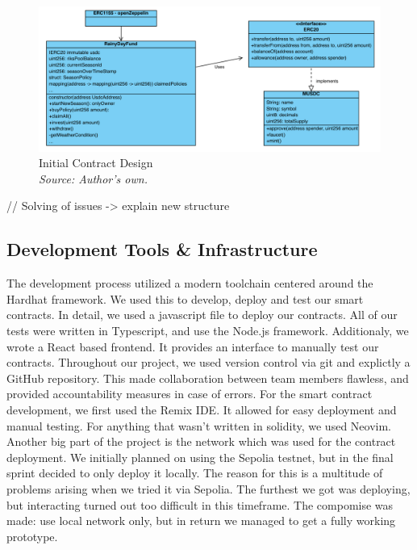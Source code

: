 \documentclass[11pt,a4paper]{article}
\begin{document}
    \begin{figure}[H]
        \centering
        \includegraphics[scale=0.5]{graphics/ClassDiagram_Old}
        \caption{Initial Contract Design \\ \textit{Source: Author's own.}}
        \label{fig:initial-contract-design}
    \end{figure}

    // Solving of issues -> explain new structure

    \subsection{Development Tools \& Infrastructure }\label{subsec:development-tools-infrastructure}
    The development process utilized a modern toolchain centered around the Hardhat framework. We used this to develop, deploy and test our smart contracts. In detail, we used a javascript file to deploy our contracts. All of our tests were written in Typescript, and use the Node.js framework.
    Additionaly, we wrote a React based frontend. It provides an interface to manually test our contracts.
    Throughout our project, we used version control via git and explictly a GitHub repository. This made collaboration between team members flawless, and provided accountability measures in case of errors.
    For the smart contract development, we first used the Remix IDE. It allowed for easy deployment and manual testing. For anything that wasn't written in solidity, we used Neovim.
    Another big part of the project is the network which was used for the contract deployment. We initially planned on using the Sepolia testnet, but in the final sprint decided to only deploy it locally. The reason for this is a multitude of problems arising when we tried it via Sepolia. The furthest we got was deploying, but interacting turned out too difficult in this timeframe. The compomise was made: use local network only, but in return we managed to get a fully working prototype.
\end{document}
